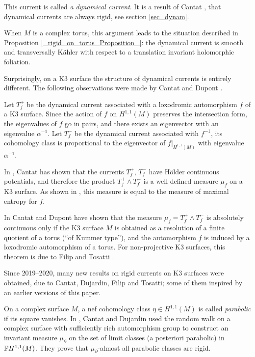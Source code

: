 \documentclass[11pt]{article}
\newcommand{\6}{\partial}
\begin{document}
This current is called {\em a dynamical current}.
It is a result of Cantat \cite{_Cantat:K3_},
that dynamical currents are always rigid,
see section \ref{sec_dynam}.

When $M$ is a complex torus, this argument
leads to the situation described in 
Proposition \ref{_rigid_on_torus_Proposition_}:
the dynamical current is smooth and 
transversally K\"ahler with respect
to a translation invariant holomorphic
foliation. 

Surprisingly, on a K3 surface the
structure of dynamical currents is entirely
different. The following observations were
made by Cantat and Dupont \cite{_Cantat_Dupont_}.

Let $T_f^+$ be the
dynamical current associated with
a loxodromic automorphism $f$ of a K3
surface. Since the action of $f$ on $H^{1,1}(M)$
preserves the intersection form,
the eigenvalues of $f$ go in pairs,
and there exists an eigenvector with
an eigenvalue $\alpha^{-1}$.
Let $T^-_f$ be the dynamical current
associated with $f^{-1}$,
its cohomology class is proportional
to the eigenvector of $f|_{H^{1,1}(M)}$
with eigenvalue $\alpha^{-1}$.

In \cite{_Cantat:K3_,_Cantat:automorphisms_},
Cantat has shown that the currents
$T^+_f$, $T^-_f$ have H\"older continuous
potentials, and therefore the product
$T^+_f\wedge T^-_f$ is a well defined
measure $\mu_f$ on a K3 surface. As shown in \cite{_Cantat:automorphisms_},
this measure is equal to the measure of maximal entropy for $f$.

In \cite{_Cantat_Dupont_}
Cantat and Dupont have shown that
the measure $\mu_f=T^+_f\wedge T^-_f$
is absolutely continuous only if
the K3 surface $M$ is obtained as
a resolution of a finite quotient of a torus
(``of Kummer type''), and the automorphism
$f$ is induced by a loxodromic automorphism
of a torus.
For non-projective K3 surfaces, this theorem
is due to Filip and Tosatti \cite{_Filip_Tosatti:rigidity_}.

Since 2019--2020, many new results on
rigid currents on K3 surfaces were obtained,
due to Cantat, Dujardin, Filip and Tosatti;
some of them inspired by an earlier versions
of this paper.

On a complex surface $M$, a nef cohomology
class $\eta\in H^{1,1}(M)$ is called {\em parabolic}
if its square vanishes.
In \cite[Theorem 6.11]{_Cantat_Dujardin:random_},
Cantat and Dujardin used the random walk on
a complex surface with sufficiently rich
automorphism group to construct an invariant
measure $\mu_\6$ on the set of limit classes
(a posteriori parabolic) in ${\Bbb P}H^{1,1}(M)$.
They prove that $\mu_\6$-almost all
parabolic classes are rigid.
\end{document}
